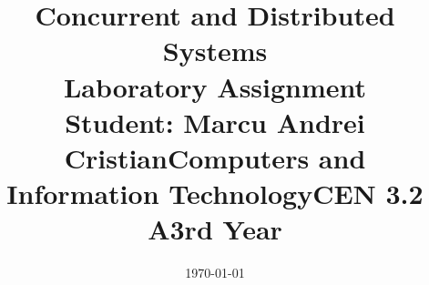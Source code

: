 \documentclass[14pt]{article}
\begin{document}
\title{%
  \huge Concurrent and Distributed Systems \\
  \vspace{20mm}
  \large Laboratory Assignment \\}

\date{\today}
\maketitle
\begin{center}
\vspace{30 mm}

\title{\huge Student: Marcu Andrei Cristian}
\\\vspace{10 mm}
\title{\huge Computers and Information Technology}
\\\vspace{10 mm}
\title{\huge CEN 3.2 A}
\\\vspace{10 mm}
\title{\huge 3rd Year}
\end{center}
\date{}
\maketitle

\newpage
\end{document}
